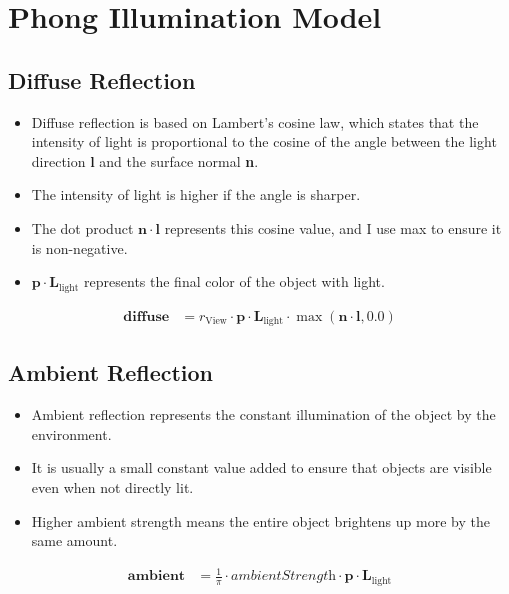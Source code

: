 \documentclass{article}
\begin{document}
	
	\section*{Phong Illumination Model}

	
	\subsection*{Diffuse Reflection}
	\begin{itemize}
		\item Diffuse reflection is based on Lambert's cosine law, which states that the intensity of light is proportional to the cosine of the angle between the light direction \textbf{l} and the surface normal \textbf{n}.
		\item The intensity of light is higher if the angle is sharper.
		\item The dot product $\bm{n} \cdot \bm{l}$ represents this cosine value, and I use max to ensure it is non-negative.
		\item $\bm{p} \cdot \bm{L}_{\text{light}}$ represents the final color of the object with light.
	\end{itemize}
	\begin{align*}
		\bm{diffuse} &= r_{\text{View}} \cdot \bm{p} \cdot \bm{L}_{\text{light}} \cdot \max(\bm{n} \cdot \bm{l}, 0.0)
	\end{align*}
	
	\subsection*{Ambient Reflection}
	\begin{itemize}
		\item Ambient reflection represents the constant illumination of the object by the environment.
		\item It is usually a small constant value added to ensure that objects are visible even when not directly lit.
		\item Higher ambient strength means the entire object brightens up more by the same amount.
	\end{itemize}
	\begin{align*}
		\bm{ambient} &= \frac{1}{\pi} \cdot \textit{ambientStrength} \cdot \bm{p} \cdot \bm{L}_{\text{light}}
	\end{align*}
	
\end{document}
